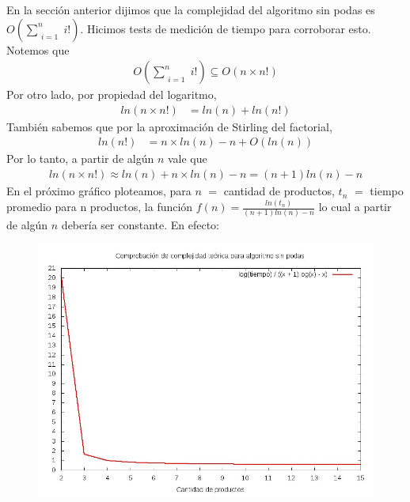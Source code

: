En la sección anterior dijimos que la complejidad del algoritmo sin podas es $O\left(\sum\limits_{\substack{i = 1}}^n i!\right)$. Hicimos tests de medición de tiempo para corroborar esto. Notemos que 
\begin{align*}
O\left(\sum\limits_{\substack{i = 1}}^n i!\right) \subseteq O(n \times n!)
\end{align*}
Por otro lado, por propiedad del logaritmo, 
\begin{align*}
ln(n \times n!) &= ln(n) + ln(n!)
\end{align*}
También sabemos que por la aproximación de Stirling del factorial, 
\begin{align*}
ln(n!) &= n \times ln(n) - n + O(ln(n))
\end{align*}
Por lo tanto, a partir de algún $n$ vale que 
\begin{align*}
ln(n \times n!) \approx ln(n) + n \times ln(n) - n = (n+1) ln(n) - n
\end{align*}
En el próximo gráfico ploteamos, para $n$ $=$ cantidad de productos, $t_n$ $=$ tiempo promedio para n productos, la función $f(n) = \frac{ln(t_n)}{(n+1) ln(n) - n}$ lo cual a partir de algún $n$ debería ser constante. En efecto:

\begin{figure}[H]
	\begin{minipage}[t]{\linewidth}
		\centering
		\includegraphics[width=\textwidth]{complejidad.jpg}
		\label{fig:p3_complejidad}
	\end{minipage}
\end{figure}

